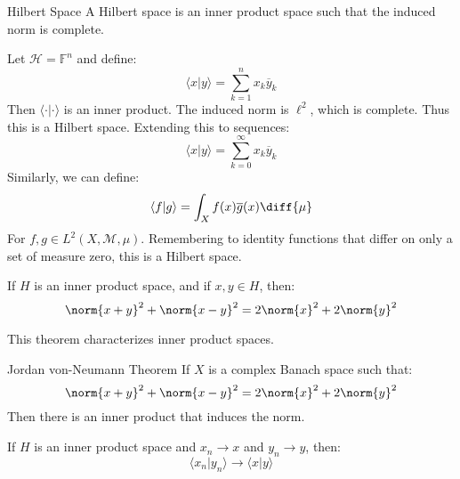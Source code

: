         \begin{ldefinition}{Hilbert Space}
            A Hilbert space is an inner product space
            such that the induced norm is complete.
        \end{ldefinition}
        \begin{lexample}
            Let $\mathcal{H}=\mathbb{F}^{n}$ and define:
            \begin{equation}
                \langle{x|y}\rangle
                =\sum_{k=1}^{n}x_{k}\overline{y}_{k}
            \end{equation}
            Then $\langle{\cdot|\cdot}\rangle$ is an inner product.
            The induced norm is $\ell^{2}$, which is complete.
            Thus this is a Hilbert space. Extending this to
            sequences:
            \begin{equation}
                \langle{x|y}\rangle
                =\sum_{k=0}^{\infty}x_{k}\overline{y}_{k}
            \end{equation}
            Similarly, we can define:
            \begin{equation}
                \langle{f|g}\rangle
                =\int_{X}f(x)\overline{g}(x)\diff{\mu}
            \end{equation}
            For $f,g\in{L}^{2}(X,\mathcal{M},\mu)$. Remembering
            to identity functions that differ on only a set
            of measure zero, this is a Hilbert space.
        \end{lexample}
        \begin{theorem}
            If $H$ is an inner product space, and if
            $x,y\in{H}$, then:
            \begin{equation}
                \norm{x+y}^{2}+\norm{x-y}^{2}=
                2\norm{x}^{2}+2\norm{y}^{2}
            \end{equation}
        \end{theorem}
        This theorem characterizes inner product spaces.
        \begin{ltheorem}{Jordan von-Neumann Theorem}
            If $X$ is a complex Banach space such that:
            \begin{equation}
                \norm{x+y}^{2}+\norm{x-y}^{2}
                =2\norm{x}^{2}+2\norm{y}^{2}
            \end{equation}
            Then there is an inner product that induces
            the norm.
        \end{ltheorem}
        \begin{theorem}
            If $H$ is an inner product space and
            $x_{n}\rightarrow{x}$ and
            $y_{n}\rightarrow{y}$, then:
            \begin{equation}
                \langle{x_{n}|y_{n}}\rangle
                \rightarrow\langle{x|y}\rangle
            \end{equation}
        \end{theorem}
